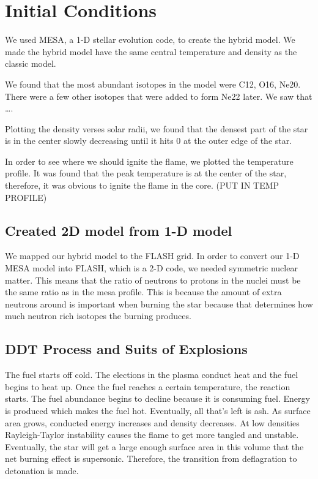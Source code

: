 \documentclass[iop,apj]{emulateapj}
\begin{document}
\section{Initial Conditions}

We used MESA, a 1-D stellar evolution code, to create the hybrid
model. We made the hybrid model have the same central temperature
and density as the classic model.

We found that the most abundant isotopes in the model were C12, O16,
Ne20. There were a few other isotopes that were added to form Ne22
later. We saw that  ….

Plotting the density verses solar radii, we found that the densest part
of the star is in the center slowly decreasing until it hits 0 at the
outer edge of the star.

In order to see where we should ignite the flame, we plotted the
temperature profile. It was found that the peak temperature is at the
center of the star, therefore, it was obvious to ignite the flame in
the core. (PUT IN TEMP PROFILE)

\subsection{Created 2D model from 1-D model}

We mapped our hybrid model to the FLASH grid. In order to convert our 1-D
MESA model into FLASH, which is a 2-D code, we needed symmetric nuclear
matter. This means that the ratio of neutrons to protons in the nuclei
must be the same ratio as in the mesa profile. This is because the amount
of extra neutrons around is important when burning the star because that
determines how much neutron rich isotopes the burning produces.


\subsection{DDT Process and Suits of Explosions}

The fuel starts off cold. The elections in the plasma conduct heat and the
fuel begins to heat up. Once the fuel reaches a certain temperature, the
reaction starts. The fuel abundance begins to decline because it is consuming
fuel. Energy is produced which makes the fuel hot. Eventually, all that’s
left is ash. As surface area grows, conducted energy increases and density
decreases. At low densities Rayleigh-Taylor instability causes the flame to
get more tangled and unstable. Eventually, the star will get a large enough
surface area in this volume that the net burning effect is supersonic.
Therefore, the transition from deflagration to detonation is made. 
\end{document}
